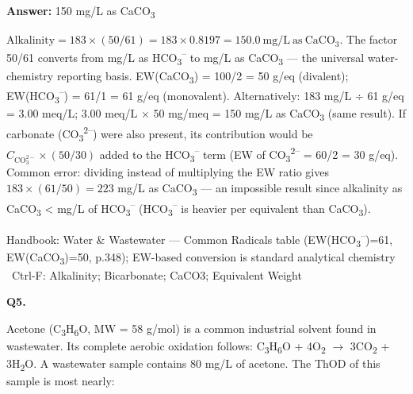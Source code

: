 \documentclass[11pt]{article}
\begin{document}
\vspace{2pt}\par\noindent\colorbox{boxbg}{\parbox{\dimexpr\linewidth-2\fboxsep\relax}{%
\vspace{2pt}\textbf{Answer:} 150 mg/L as CaCO\textsubscript{3}\par\vspace{2pt}
{\small $\text{Alkalinity} = 183\times(50/61) = 183\times0.8197 = 150.0\ \mathrm{mg/L\ as\ CaCO_3}$. The factor 50/61 converts from mg/L as HCO\textsubscript{3}\textsuperscript{--} to mg/L as CaCO\textsubscript{3} --- the universal water-chemistry reporting basis. EW(CaCO\textsubscript{3}) = 100/2 = 50 g/eq (divalent); EW(HCO\textsubscript{3}\textsuperscript{--}) = 61/1 = 61 g/eq (monovalent). Alternatively: 183 mg/L ÷ 61 g/eq = 3.00 meq/L; 3.00 meq/L $\times$ 50 mg/meq = 150 mg/L as CaCO\textsubscript{3} (same result). If carbonate (CO\textsubscript{3}\textsuperscript{2}\textsuperscript{--}) were also present, its contribution would be $C_{\mathrm{CO}_3^{2-}}\times(50/30)$ added to the HCO\textsubscript{3}\textsuperscript{--} term (EW of CO\textsubscript{3}\textsuperscript{2}\textsuperscript{--} = 60/2 = 30 g/eq). Common error: dividing instead of multiplying the EW ratio gives $183\times(61/50) = 223$ mg/L as CaCO\textsubscript{3} --- an impossible result since alkalinity as CaCO\textsubscript{3} < mg/L of HCO\textsubscript{3}\textsuperscript{--} (HCO\textsubscript{3}\textsuperscript{--} is heavier per equivalent than CaCO\textsubscript{3}).}\par\vspace{2pt}
{\footnotesize\color{soft}Handbook: Water \& Wastewater --- Common Radicals table (EW(HCO\textsubscript{3}\textsuperscript{--})=61, EW(CaCO\textsubscript{3})=50, p.348); EW-based conversion is standard analytical chemistry \textbullet\ Ctrl-F: Alkalinity; Bicarbonate; CaCO3; Equivalent Weight}\vspace{2pt}
}}
\vspace{9pt}
\filbreak
\textbf{\color{accent}Q5.}\par\vspace{2pt}
Acetone (C\textsubscript{3}H\textsubscript{6}O, MW = 58 g/mol) is a common industrial solvent found in wastewater. Its complete aerobic oxidation follows: C\textsubscript{3}H\textsubscript{6}O + 4O\textsubscript{2} $\rightarrow$ 3CO\textsubscript{2} + 3H\textsubscript{2}O. A wastewater sample contains 80 mg/L of acetone. The ThOD of this sample is most nearly:\par\vspace{3pt}
\end{document}
